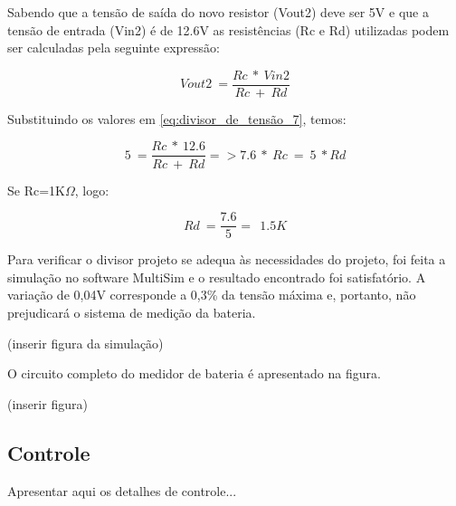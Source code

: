 		Sabendo que a tensão de saída do novo resistor (Vout2) deve ser 5V e que a tensão de entrada (Vin2) é de 12.6V as resistências (Rc e Rd) utilizadas podem ser calculadas pela seguinte expressão:

		\begin{equation}
		\label{eq:divisor_de_tensão_7}
			Vout2\ =\frac{Rc\ *\ Vin2}{Rc\ +\ Rd}
		\end{equation}

		Substituindo os valores em \ref{eq:divisor_de_tensão_7}, temos:

		\begin{equation}
		\label{eq:divisor_de_tensão_8}
			5\ =\frac{Rc\ *\ 12.6}{Rc\ +\ Rd} => 7.6\ *\ Rc\ =\ 5\ *Rd
		\end{equation}

		Se Rc=1K$\Omega$, logo:

		\begin{equation}
		\label{eq:divisor_de_tensão_9}
			Rd\ =\frac{7.6}{5} =~\ 1.5K
		\end{equation}

		Para verificar o divisor projeto se adequa às necessidades do projeto, foi feita a simulação no software MultiSim e o resultado encontrado foi satisfatório. A variação de 0,04V corresponde a 0,3\% da tensão máxima e, portanto, não prejudicará o sistema de medição da bateria.

		(inserir figura da simulação)

		O circuito completo do medidor de bateria é apresentado na figura.

		(inserir figura)			

	\subsection{Controle} %
	\label{sub:controle2}
		
		Apresentar aqui os detalhes de controle...
